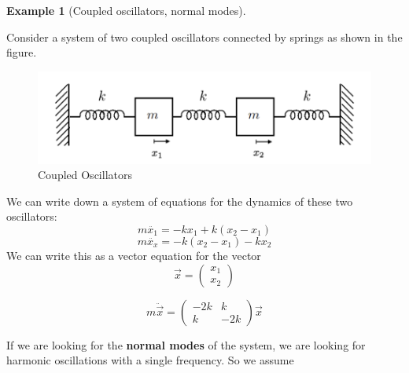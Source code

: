 \documentclass[
  a4paper,
  DIV=11,
  numbers=noendperiod,
  oneside]{scrreprt}
\theoremstyle{definition}
\newtheorem{example}{Example}[chapter]
\theoremstyle{remark}
\begin{document}
\begin{example}[Coupled oscillators, normal
modes]\protect\hypertarget{exm-}{}\label{exm-}

Consider a system of two coupled oscillators connected by springs as
shown in the figure.

\begin{figure}[H]

{\centering \includegraphics[width=0.7\linewidth,height=\textheight,keepaspectratio]{coupledosc.png}

}

\caption{Coupled Oscillators}

\end{figure}%

We can write down a system of equations for the dynamics of these two
oscillators: \[ m \ddot{x_1} = - k x_1 + k (x_2-x_1) \]
\[ m \ddot{x_x} = - k (x_2 -x_1) - k x_2 \] We can write this as a
vector equation for the vector
\[\vec{x} =\begin{pmatrix} x_1 \\ x_2 \end{pmatrix} \]

\[ m \ddot{\vec{x}} = \begin{pmatrix} -2 k & k \\ k & -2k  \end{pmatrix} \vec{x}\]

If we are looking for the \textbf{normal modes} of the system, we are
looking for harmonic oscillations with a single frequency. So we assume


\end{example}
\end{document}
